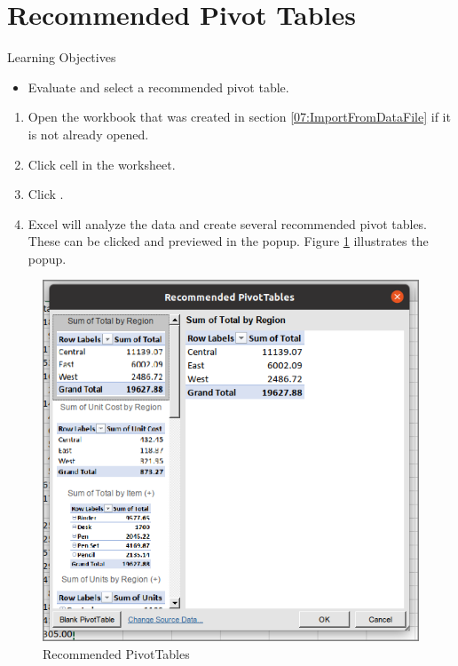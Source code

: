 \section{Recommended Pivot Tables}

\begin{center}
	\begin{objbox}{Learning Objectives}
		\begin{itemize}
			\setlength{\itemsep}{0pt}
			\setlength{\parskip}{0pt}
			\setlength{\parsep}{0pt}
			
			\item Evaluate and select a recommended pivot table.
			
		\end{itemize}
	\end{objbox}
\end{center}

\begin{enumerate}
	\item Open the  workbook that was created in section \ref{07:ImportFromDataFile} if it is not already opened.
	\item Click cell  in the  worksheet.
	\item Click .
	\item Excel will analyze the data and create several recommended pivot tables. These can be clicked and previewed in the  popup. Figure \ref{07:fig26} illustrates the  popup.
\end{enumerate}

\begin{figure}[H]
	\centering
	\includegraphics[width=\maxwidth{.95\linewidth}]{gfx/ch07_fig26}
	\caption{Recommended PivotTables}
	\label{07:fig26}
\end{figure}

